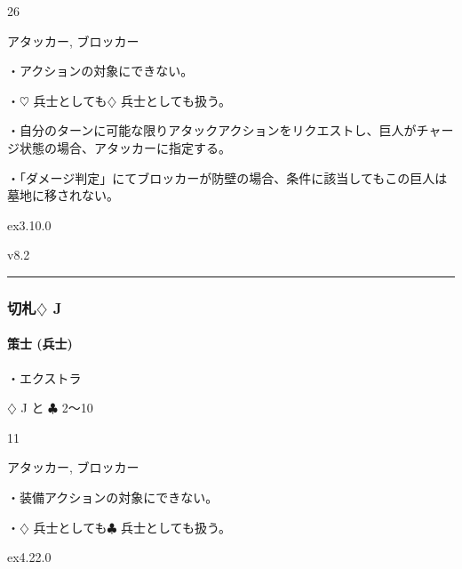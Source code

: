 \documentclass[letterpaper,10pt,dvipdfmx]{sphinxmanual}
\begin{document}
\sphinxAtStartPar
{} 26

\sphinxAtStartPar
{} アタッカー, ブロッカー

\sphinxAtStartPar
{}

\sphinxAtStartPar
・アクションの対象にできない。

\sphinxAtStartPar
・{\normalsize $\heartsuit$} 兵士としても{\normalsize $\diamondsuit$} 兵士としても扱う。

\sphinxAtStartPar
・自分のターンに可能な限りアタックアクションをリクエストし、巨人がチャージ状態の場合、アタッカーに指定する。

\sphinxAtStartPar
・「ダメージ判定」にてブロッカーが防壁の場合、条件に該当してもこの巨人は墓地に移されない。

\sphinxAtStartPar
{}  ex3.10.0

\sphinxAtStartPar
{}  v8.2


\bigskip\hrule\bigskip



\subsubsection{切札{\normalsize $\diamondsuit$} J}
\label{\detokenize{auto/frameActionlist:id95}}

\paragraph{策士 (兵士)}
\label{\detokenize{auto/frameActionlist:char-strategist}}\label{\detokenize{auto/frameActionlist:id96}}
\sphinxAtStartPar
{}

\sphinxAtStartPar
・エクストラ

\sphinxAtStartPar
{} {\normalsize $\diamondsuit$} J と {\normalsize $\clubsuit$} 2〜10

\sphinxAtStartPar
{} 11

\sphinxAtStartPar
{} アタッカー, ブロッカー

\sphinxAtStartPar
{}

\sphinxAtStartPar
・装備アクションの対象にできない。

\sphinxAtStartPar
・{\normalsize $\diamondsuit$} 兵士としても{\normalsize $\clubsuit$} 兵士としても扱う。

\sphinxAtStartPar
{}  ex4.22.0
\end{document}
